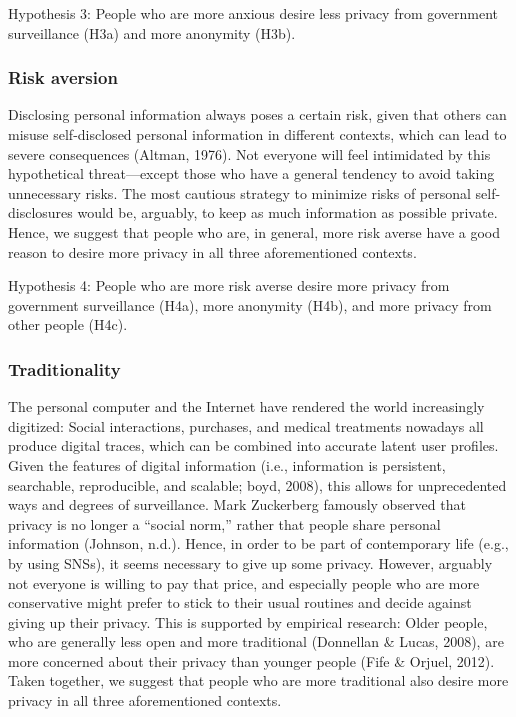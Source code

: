\documentclass[man,floatsintext]{apa6}
\theoremstyle{definition}
\theoremstyle{definition}
\theoremstyle{definition}
\theoremstyle{remark}
\begin{document}
Hypothesis 3: People who are more anxious desire less privacy from
government surveillance (H3a) and more anonymity (H3b).

\hypertarget{risk-aversion}{%
\subsubsection{Risk aversion}\label{risk-aversion}}

Disclosing personal information always poses a certain risk, given that
others can misuse self-disclosed personal information in different
contexts, which can lead to severe consequences (Altman, 1976). Not
everyone will feel intimidated by this hypothetical threat---except
those who have a general tendency to avoid taking unnecessary risks. The
most cautious strategy to minimize risks of personal self-disclosures
would be, arguably, to keep as much information as possible private.
Hence, we suggest that people who are, in general, more risk averse have
a good reason to desire more privacy in all three aforementioned
contexts.

Hypothesis 4: People who are more risk averse desire more privacy from
government surveillance (H4a), more anonymity (H4b), and more privacy
from other people (H4c).

\hypertarget{traditionality}{%
\subsubsection{Traditionality}\label{traditionality}}

The personal computer and the Internet have rendered the world
increasingly digitized: Social interactions, purchases, and medical
treatments nowadays all produce digital traces, which can be combined
into accurate latent user profiles. Given the features of digital
information (i.e., information is persistent, searchable, reproducible,
and scalable; boyd, 2008), this allows for unprecedented ways and
degrees of surveillance. Mark Zuckerberg famously observed that privacy
is no longer a \enquote{social norm,} rather that people share personal
information (Johnson, n.d.). Hence, in order to be part of contemporary
life (e.g., by using SNSs), it seems necessary to give up some privacy.
However, arguably not everyone is willing to pay that price, and
especially people who are more conservative might prefer to stick to
their usual routines and decide against giving up their privacy. This is
supported by empirical research: Older people, who are generally less
open and more traditional (Donnellan \& Lucas, 2008), are more concerned
about their privacy than younger people (Fife \& Orjuel, 2012). Taken
together, we suggest that people who are more traditional also desire
more privacy in all three aforementioned contexts.
\end{document}
